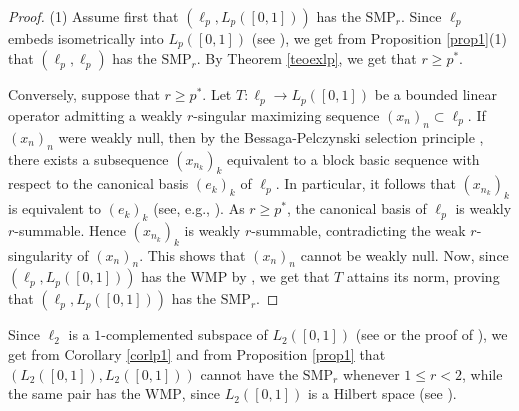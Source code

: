 \documentclass[12 pt]{article}%
\newtheorem{corollary}[theorem]{Corollary}
\newtheorem{final remark}[theorem]{Final Remark}
\begin{document}
\begin{proof}
(1) Assume first that $(\ell_p, L_p([0,1]))$  has the $\mathrm{SMP}_r$. Since $\ell_p$ embeds isometrically into $L_p([0,1])$ (see \cite[Proposition 6.4.18]{albiac}), we get  from  Proposition \ref{prop1}(1) that $(\ell_p, \ell_p)$ has the $\mathrm{SMP}_r$. By Theorem \ref{teoexlp}, we get that $r \geq p^*$.


Conversely, suppose that $r \geq p^*$. Let $T: \ell_p \to L_p([0,1])$ be a bounded linear operator admitting a weakly $r$-singular maximizing sequence $(x_n)_n \subset \ell_p$. If $(x_n)_n$ were weakly null, then by the Bessaga-Pelczynski selection principle \cite[Proposition 1.3.10]{albiac}, there exists a subsequence $(x_{n_k})_k$ equivalent to a block basic sequence with respect to the canonical basis $(e_k)_k$ of $\ell_p$. In particular, it follows that $(x_{n_k})_k$ is equivalent to $(e_k)_k$ (see, e.g., \cite[p. 426]{danieleduardo}). As $r \geq p^*$, the canonical basis of $\ell_p$ is weakly $r$-summable. Hence $(x_{n_k})_k$ is weakly $r$-summable, contradicting the 
 weak $r$-singularity of $(x_n)_n$. This shows that $(x_n)_n$ cannot be weakly null. Now, since $(\ell_p, L_p([0,1]))$ has the $\mathrm{WMP}$ by \cite[Example 3]{han}, we get that $T$ attains its norm, proving that $(\ell_p, L_p([0,1]))$ has the $\mathrm{SMP}_r$.
    \end{proof}


Since $\ell_2$ is a $1$-complemented subspace of $L_2([0,1])$ (see \cite[Theorem 6.2.13 and Theorem 6.4.2]{albiac} or the proof of \cite[Theorem 3.2]{dantasjung}), we get from Corollary \ref{corlp1} and from Proposition \ref{prop1} that $(L_2([0,1]), L_2([0,1]))$ cannot have the $\mathrm{SMP}_r$ whenever $1 \leq r < 2$, while the same pair has the $\mathrm{WMP}$, since $L_2([0,1])$ is a Hilbert space (see \cite[p. 5]{arongarciapelteix}). 
\end{document}
